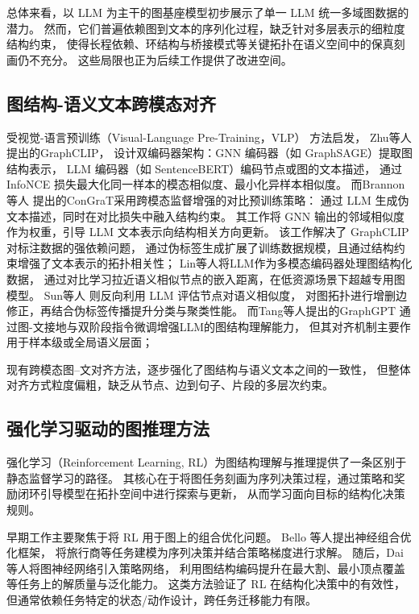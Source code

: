 总体来看，以 LLM 为主干的图基座模型初步展示了单一 LLM 统一多域图数据的潜力。
然而，它们普遍依赖图到文本的序列化过程，缺乏针对多层表示的细粒度结构约束，
使得长程依赖、环结构与桥接模式等关键拓扑在语义空间中的保真刻画仍不充分。
这些局限也正为后续工作提供了改进空间。

\subsection{图结构-语义文本跨模态对齐}
受视觉-语言预训练（Visual-Language Pre-Training，VLP）
方法\cite{Radford2021LearningTV}启发，
Zhu等人提出的GraphCLIP\cite{Zhu2024GraphCLIPET}，
设计双编码器架构：GNN 编码器（如 GraphSAGE\cite{Hamilton2017InductiveRL}）提取图结构表示，
LLM 编码器（如 SentenceBERT\cite{Reimers2019SentenceBERTSE}）编码节点或图的文本描述，
通过 InfoNCE 损失最大化同一样本的模态相似度、最小化异样本相似度。
而Brannon等人\cite{Brannon2023ConGraTSC} 提出的ConGraT采用跨模态监督增强的对比预训练策略：
通过 LLM 生成伪文本描述，同时在对比损失中融入结构约束。
其工作将 GNN 输出的邻域相似度作为权重，引导 LLM 文本表示向结构相关方向更新。
该工作解决了 GraphCLIP\cite{Zhu2024GraphCLIPET} 对标注数据的强依赖问题，
通过伪标签生成扩展了训练数据规模，且通过结构约束增强了文本表示的拓扑相关性；
Lin等人\cite{Lin2024GT2VecLL}将LLM作为多模态编码器处理图结构化数据，
通过对比学习拉近语义相似节点的嵌入距离，在低资源场景下超越专用图模型。
Sun等人\cite{Sun2023LargeLM} 则反向利用 LLM 评估节点对语义相似度，
对图拓扑进行增删边修正，再结合伪标签传播提升分类与聚类性能。 
而Tang等人\cite{Tang2023GraphGPTGI}提出的GraphGPT
通过图-文接地与双阶段指令微调增强LLM的图结构理解能力，
但其对齐机制主要作用于样本级或全局语义层面；

现有跨模态图–文对齐方法，逐步强化了图结构与语义文本之间的一致性，
但整体对齐方式粒度偏粗，缺乏从节点、边到句子、片段的多层次约束。

\subsection{强化学习驱动的图推理方法}

强化学习（Reinforcement Learning, RL）为图结构理解与推理提供了一条区别于静态监督学习的路径。
其核心在于将图任务刻画为序列决策过程，通过策略和奖励闭环引导模型在拓扑空间中进行探索与更新，
从而学习面向目标的结构化决策规则。

早期工作主要聚焦于将 RL 用于图上的组合优化问题。
Bello 等人\cite{Bello2016NeuralCO}提出神经组合优化框架，
将旅行商等任务建模为序列决策并结合策略梯度进行求解。
随后，Dai 等人\cite{Khalil2017LearningCO}将图神经网络引入策略网络，
利用图结构编码提升在最大割、最小顶点覆盖等任务上的解质量与泛化能力。
这类方法验证了 RL 在结构化决策中的有效性，但通常依赖任务特定的状态/动作设计，跨任务迁移能力有限。

